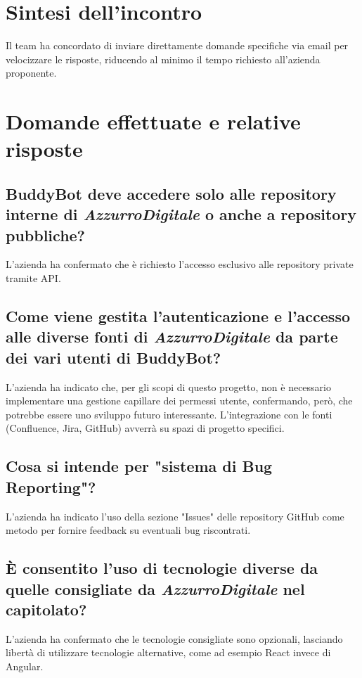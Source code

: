 \documentclass[italian, 12pt]{article}
\begin{document}
\section{Sintesi dell'incontro}
Il team ha concordato di inviare direttamente domande specifiche via email per velocizzare le risposte, riducendo al minimo il tempo richiesto all'azienda proponente.

\section{Domande effettuate e relative risposte}
\subsection{BuddyBot deve accedere solo alle repository interne di \textit{AzzurroDigitale} o anche a repository pubbliche?}
L'azienda ha confermato che è richiesto l'accesso esclusivo alle repository private tramite API.

\subsection{Come viene gestita l'autenticazione e l'accesso alle diverse fonti di \textit{AzzurroDigitale} da parte dei vari utenti di BuddyBot?}
L'azienda ha indicato che, per gli scopi di questo progetto, non è necessario implementare una gestione capillare dei permessi utente, confermando, però, che potrebbe essere uno sviluppo futuro interessante. L'integrazione con le fonti (Confluence, Jira, GitHub) avverrà su spazi di progetto specifici.

\subsection{Cosa si intende per "sistema di Bug Reporting"?}
L'azienda ha indicato l'uso della sezione "Issues" delle repository GitHub come metodo per fornire feedback su eventuali bug riscontrati.

\subsection{È consentito l'uso di tecnologie diverse da quelle consigliate da \textit{AzzurroDigitale} nel capitolato?}
L'azienda ha confermato che le tecnologie consigliate sono opzionali, lasciando libertà di utilizzare tecnologie alternative, come ad esempio React invece di Angular.
\end{document}
